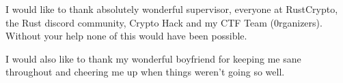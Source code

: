 I would like to thank absolutely wonderful supervisor, everyone at 
RustCrypto, the Rust discord community, Crypto Hack and my CTF Team (0rganizers).
Without your help none of this would have been possible.

I would also like to thank my wonderful boyfriend for keeping me sane throughout and cheering me up when things weren't going so well.
